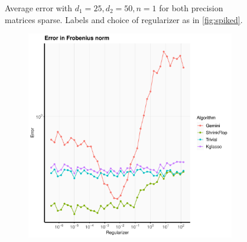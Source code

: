 \documentclass[aos]{imsart}
\theoremstyle{definition}
\numberwithin{equation}{section}
\begin{document}
\begin{figure}
\begin{subfigure}[b]{.4\textwidth}
         \end{subfigure}
\caption{Average error with $d_1 = 25, d_2 = 50, n = 1$ for both precision matrices sparse.
Labels and choice of regularizer as in \cref{fig:spiked}.\label{fig:sparse-ii}}
\end{figure}


\begin{figure}
         \centering
                       \begin{subfigure}[b]{.4\textwidth}
         \includegraphics[width=\textwidth]{./code/zhou-comparison/25-50-sparse-frob.pdf}
         \end{subfigure}
         \begin{subfigure}[b]{.4\textwidth}

\end{subfigure}
\end{figure}
\end{document}

